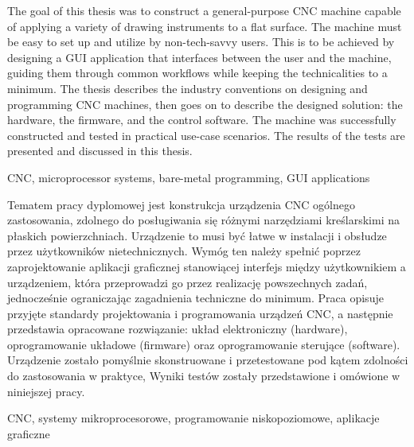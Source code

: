 \abstract
The goal of this thesis was to construct a general-purpose CNC machine capable
of applying a variety of drawing instruments to a flat surface. The machine
must be easy to set up and utilize by non-tech-savvy users. This is to be
achieved by designing a GUI application that interfaces between the user and the
machine, guiding them through common workflows while keeping the technicalities
to a minimum. The thesis describes the industry conventions on designing and
programming CNC machines, then goes on to describe the designed solution: the
hardware, the firmware, and the control software. The machine was successfully
constructed and tested in practical use-case scenarios. The results of the tests
are presented and discussed in this thesis.

\keywords CNC, microprocessor systems, bare-metal programming, GUI applications

\bigskip
\secondabstract
Tematem pracy dyplomowej jest konstrukcja urządzenia CNC ogólnego zastosowania,
zdolnego do posługiwania się różnymi narzędziami kreślarskimi na płaskich
powierzchniach. Urządzenie to musi być łatwe w instalacji i obsłudze przez
użytkowników nietechnicznych. Wymóg ten należy spełnić poprzez zaprojektowanie
aplikacji graficznej stanowiącej interfejs między użytkownikiem a urządzeniem,
która przeprowadzi go przez realizację powszechnych zadań, jednocześnie
ograniczając zagadnienia techniczne do minimum. Praca opisuje przyjęte standardy
projektowania i programowania urządzeń CNC, a następnie przedstawia opracowane
rozwiązanie: układ elektroniczny (hardware), oprogramowanie układowe (firmware)
oraz oprogramowanie sterujące (software). Urządzenie zostało pomyślnie
skonstruowane i przetestowane pod kątem zdolności do zastosowania w praktyce,
Wyniki testów zostały przedstawione i omówione w niniejszej pracy.

\secondkeywords CNC, systemy mikroprocesorowe, programowanie niskopoziomowe,
aplikacje graficzne
